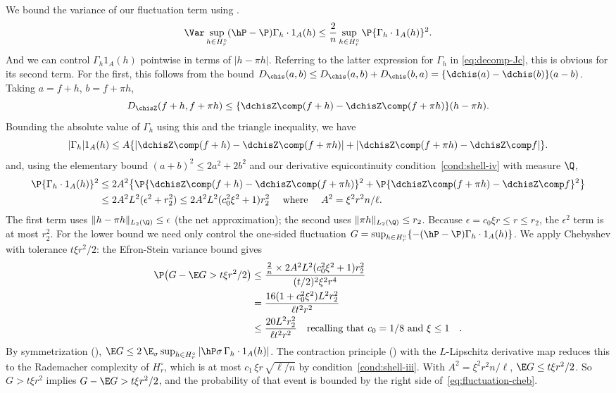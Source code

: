 \documentclass{article}
\begin{document}
We bound the variance of our fluctuation term using .
\[
\Var \sup_{h \in H_r^\circ} (\hP - \P) \Gamma_h \cdot 1_A(h) \le \frac{2}{n} \sup_{h \in H_r^\circ} \P \{\Gamma_h \cdot 1_A(h)\}^2.
\]
And we can control $\Gamma_h 1_A(h)$  pointwise in terms of  $|h - \pi h|$. Referring to the latter expression for $\Gamma_h$ in \eqref{eq:decomp-Jc}, this is obvious for its second term. For the first,
this follows from the bound $D_{\chis}(a,b) \le D_{\chis}(a,b) + D_{\chis}(b,a) = \{\dchis(a) - \dchis(b)\}(a-b)$. Taking $a = f+h$, $b = f+\pi h$,
\[
D_{\chisZ}(f+h, f+\pi h) \le \{ \dchisZ \comp (f+h) - \dchisZ \comp (f+\pi h)\}(h - \pi h).
\]
Bounding the absolute value of $\Gamma_h$ using this and the triangle inequality, we have
\[
|\Gamma_h| 1_A(h) \le A \qty{\qty|\dchisZ \comp (f+h) - \dchisZ \comp (f+\pi h)| + \qty|\dchisZ \comp (f+\pi h) - \dchisZ \comp f|}.
\]
and, using the elementary bound $(a+b)^2 \le 2a^2 + 2b^2$ and our derivative equicontinuity condition~\ref{cond:shell-iv} with measure $\Q$,
\begin{align*}
\P \{\Gamma_h \cdot 1_A(h)\}^2 &\le 2A^2 \qty{\P\{\dchisZ \comp (f+h) - \dchisZ \comp (f+\pi h)\}^2 + \P\{\dchisZ \comp (f+\pi h) - \dchisZ \comp f\}^2} \\
&\le 2 A^2 L^2 (\epsilon^2 + r_2^2) \le 2A^2 L^2(c_0^2\xi^2 + 1) r_2^2
\qqtext{ where }  A^2 = \xi^2 r^2 n/\ell.
\end{align*}
The first term uses $\|h - \pi h\|_{L_2(\Q)} \le \epsilon$ (the net approximation); the second uses $\|\pi h\|_{L_2(\Q)} \le r_2$. Because $\epsilon = c_0\xi r \le r \le r_2$, the $\epsilon^2$ term is at most $r_2^2$.
For the lower bound we need only control the one-sided fluctuation $G = \sup_{h \in H_r^\circ}\{-(\hP - \P)\Gamma_h \cdot 1_A(h)\}$. We apply Chebyshev with tolerance $t\xi r^2/2$: the Efron-Stein variance bound gives
\begin{equation}\label{eq:fluctuation-cheb}
\begin{aligned}
  \P\qty(G - \E G > t\xi r^2/2)
  &\le  \frac{\frac{2}{n} \times  2A^2 L^2(c_0^2\xi^2 + 1)r_2^2}{(t/2)^2\xi^2 r^4} \\
  &= \frac{16(1+c_0^2\xi^2) L^2 r_2^2}{\ell t^2 r^2} \\
  &\le \frac{20 L^2 r_2^2}{\ell t^2 r^2} \qqtext{recalling that $c_0=1/8$ and $\xi \le 1$}.
\end{aligned}
\end{equation}
By symmetrization (),
$\E G
  \le 2\,\E_\sigma \sup_{h \in H_r^\circ}
    |\hP \sigma\, \Gamma_h \cdot 1_A(h)|$.
The contraction principle ()
with the $L$-Lipschitz derivative map
reduces this to the Rademacher complexity
of $H_r^\circ$,
which is at most $c_1\,\xi r\,\sqrt{\ell/n}$
by condition~\ref{cond:shell-iii}.
With $A^2 = \xi^2 r^2 n/\ell$,
$\E G \le t\xi r^2/2$.
So $G > t\xi r^2$ implies $G - \E G > t\xi r^2/2$,
and the probability of that event is bounded
by the right side of~\eqref{eq:fluctuation-cheb}.
\end{document}
